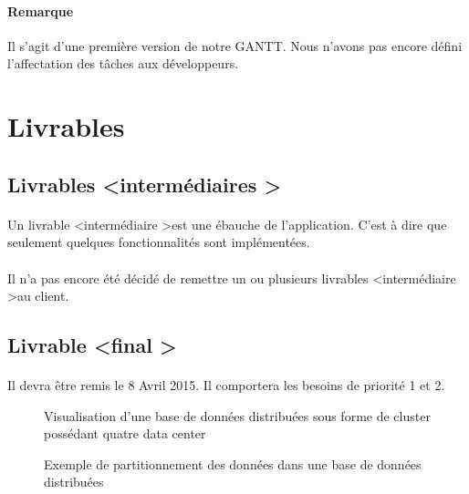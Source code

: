 \documentclass[12pt]{article}
\begin{document}
 \vspace{1cm}
 
\paragraph{Remarque} Il s'agit d'une première version de notre GANTT. Nous n'avons pas encore défini l'affectation des tâches aux développeurs.


\newpage

\section{Livrables}

\subsection{Livrables \textless intermédiaires \textgreater}

\paragraph{} Un livrable \textless intermédiaire \textgreater est une ébauche de l'application. C'est à dire que seulement quelques fonctionnalités sont implémentées.

\paragraph{} Il n'a pas encore été décidé de remettre un ou plusieurs livrables \textless intermédiaire \textgreater au client.

\subsection{Livrable \textless final \textgreater}

\paragraph{} Il devra être remis le 8 Avril 2015. Il comportera les besoins de priorité 1 et 2.


\begin{figure}[p]
	\centering
		
	\caption{Visualisation d'une base de données distribuées sous forme de cluster possédant quatre data center\label{fig:distributed_database}}
\end{figure}

\begin{figure}[p]
	\centering
		
	\caption{Exemple de partitionnement des données dans une base de données distribuées\label{fig:partitionning}}
\end{figure}
\end{document}
